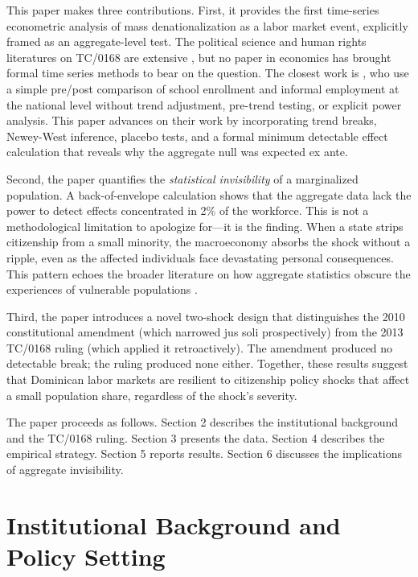 \documentclass[12pt]{article}
\begin{document}
This paper makes three contributions. First, it provides the first time-series econometric analysis of mass denationalization as a labor market event, explicitly framed as an aggregate-level test. The political science and human rights literatures on TC/0168 are extensive \citep{belton2020statelessness, chen2023denationalization}, but no paper in economics has brought formal time series methods to bear on the question. The closest work is \citet{amuedo2017dominican}, who use a simple pre/post comparison of school enrollment and informal employment at the national level without trend adjustment, pre-trend testing, or explicit power analysis. This paper advances on their work by incorporating trend breaks, Newey-West inference, placebo tests, and a formal minimum detectable effect calculation that reveals why the aggregate null was expected ex ante.

Second, the paper quantifies the \textit{statistical invisibility} of a marginalized population. A back-of-envelope calculation shows that the aggregate data lack the power to detect effects concentrated in 2\% of the workforce. This is not a methodological limitation to apologize for---it is the finding. When a state strips citizenship from a small minority, the macroeconomy absorbs the shock without a ripple, even as the affected individuals face devastating personal consequences. This pattern echoes the broader literature on how aggregate statistics obscure the experiences of vulnerable populations \citep{watson2014inside, alsan2024fear}.

Third, the paper introduces a novel two-shock design that distinguishes the 2010 constitutional amendment (which narrowed jus soli prospectively) from the 2013 TC/0168 ruling (which applied it retroactively). The amendment produced no detectable break; the ruling produced none either. Together, these results suggest that Dominican labor markets are resilient to citizenship policy shocks that affect a small population share, regardless of the shock's severity.

The paper proceeds as follows. Section 2 describes the institutional background and the TC/0168 ruling. Section 3 presents the data. Section 4 describes the empirical strategy. Section 5 reports results. Section 6 discusses the implications of aggregate invisibility.

\section{Institutional Background and Policy Setting}
\end{document}
